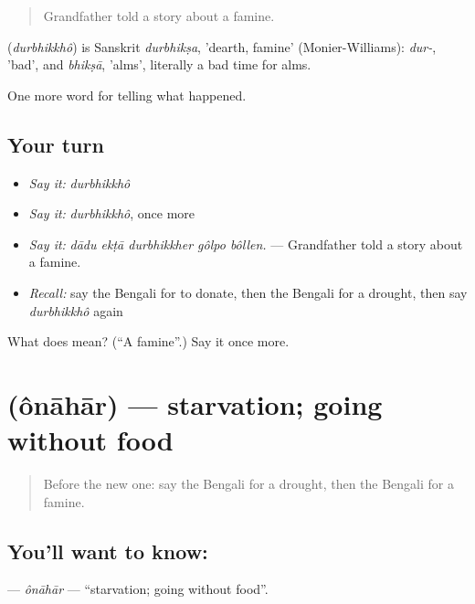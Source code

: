\begin{quote}
Grandfather told a story about a famine.
\end{quote}

\begin{cousinweb}
\textbf{} (\emph{durbhikkhô}) is Sanskrit \emph{durbhikṣa}, 'dearth, famine' (Monier-Williams): \emph{dur-}, 'bad', and \emph{bhikṣā}, 'alms', literally a bad time for alms.
\end{cousinweb}

\begin{grammarlens}[title={What you've built}]
One more word for telling what happened.
\end{grammarlens}

\subsection*{Your turn}
\begin{itemize}
\raggedright
  \item \emph{Say it:} \emph{durbhikkhô}
  \item \emph{Say it:} \emph{durbhikkhô}, once more
  \item \emph{Say it:} \emph{dādu ekṭā durbhikkher gôlpo bôllen.} — Grandfather told a story about a famine.
  \item \emph{Recall:} say the Bengali for to donate, then the Bengali for a drought, then say \emph{durbhikkhô} again
\end{itemize}

\begin{tcolorbox}[breakable,colback=teal!4,colframe=teal!35!black,title={Before you move on}]
What does  mean? (\textquotedblleft{}A famine\textquotedblright{}.) Say it once more.
\end{tcolorbox}
\section[\texorpdfstring{\bn{অনাহার} (ônāhār)}{অনাহার (ônāhār)}]{ (ônāhār) — starvation; going without food}

\label{lesson:BN-C292-onahar}



\begin{quote}
Before the new one: say the Bengali for a drought, then the Bengali for a famine.
\end{quote}

\subsection*{You'll want to know: }
\textbf{} — \emph{ônāhār} — \textquotedblleft{}starvation; going without food\textquotedblright{}.

